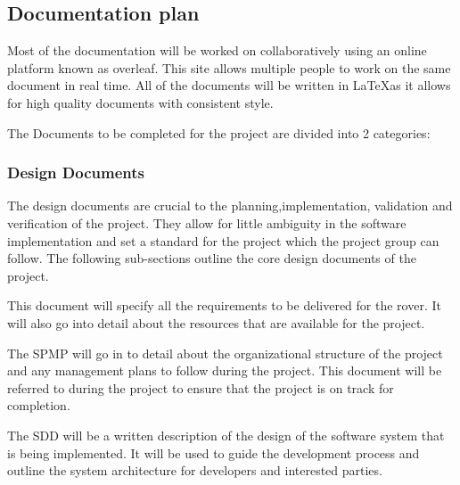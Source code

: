 \documentclass{article}
\newcounter{subsubsubsection}[subsubsection]
\begin{document}
\subsection{Documentation plan} \label{documentation plan}
\begin{adjustwidth}{1em}{0pt}
Most of the documentation will be worked on collaboratively using an online platform known as overleaf. This site allows multiple people to work on the same document in real time. All of the documents will be written in \LaTeX as it allows for high quality documents with consistent style.

The Documents to be completed for the project are divided into 2 categories:
\end{adjustwidth}

\subsubsection{Design Documents}
\begin{adjustwidth}{2em}{0pt}
The design documents are crucial to the planning,implementation, validation and verification of the project. They allow for little ambiguity in the software implementation and set a standard for the project which the project group can follow. The following sub-sections outline the core design documents of the project.
\end{adjustwidth}

\begin{adjustwidth}{3em}{0pt}
This document will specify all the requirements to be delivered for the rover. It will also go into detail about the resources that are available for the project. 
\end{adjustwidth}

\begin{adjustwidth}{3em}{0pt}
The SPMP will go in to detail about the organizational structure of the project and any management plans to follow during the project. This document will be referred to during the project to ensure that the project is on track for completion.
\end{adjustwidth}

\begin{adjustwidth}{3em}{0pt}
The SDD will be a written description of the design of the software system that is being implemented.  It will be used to guide the development process and outline the system architecture for developers and interested parties.
\end{adjustwidth}
\end{document}
